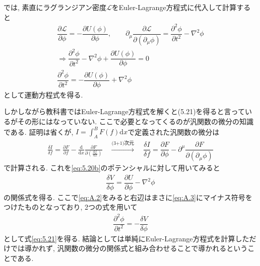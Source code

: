 \documentclass[dvipdfmx,11pt,a4paper,oneside,openany]{jsbook}
\begin{document}
では, 素直にラグランジアン密度$\mathcal{L}$をEuler-Lagrange方程式に代入して計算すると
\begin{align}
    \dfrac{\partial \mathcal{L}}{\partial \phi}=-\dfrac{\partial U(\phi)}{\partial\phi},\qquad \partial_\mu\dfrac{\partial\mathcal{L}}{\partial(\partial_\mu\phi)}=\dfrac{\partial^2 \phi}{\partial t^2}-\nabla^2\phi\nonumber \\
    \Rightarrow \dfrac{\partial^2 \phi}{\partial t^2}-\nabla^2\phi+\dfrac{\partial U(\phi)}{\partial \phi}=0\nonumber                                                                                                          \\
    \dfrac{\partial^2 \phi}{\partial t^2}=-\dfrac{\partial U(\phi)}{\partial \phi}+\nabla^2\phi\tag{A.2}\label{eq:A.2}
\end{align}
として運動方程式を得る.

しかしながら教科書ではEuler-Lagrange方程式を解くと(5.21)を得ると言っているがその形にはなっていない. ここで必要となってくるのが汎関数の微分の知識である. 証明は省くが, $I=\int_{A}^{B} F(f) \mathrm{d} x$で定義された汎関数の微分は
\begin{align*}
    \frac{\delta I}{\delta f}=\frac{\partial F}{\partial f}-\frac{\mathrm{d}}{\mathrm{d} x} \frac{\partial F}{\partial\left(\frac{\mathrm{d} f}{\mathrm{~d} x}\right)}\quad \xrightarrow[]{\text{(3+1)次元}} \quad \dfrac{\delta I}{\delta f}=\dfrac{\partial F}{\partial \phi}-\partial^{\mu}\dfrac{\partial F}{\partial\left(\partial_\mu \phi\right)}
\end{align*}
で計算される. これを\eqref{eq:5.20b}のポテンシャルに対して用いてみると
\begin{align}
    \dfrac{\delta V}{\delta \phi}=\dfrac{\partial U}{\partial \phi}-\nabla^2\phi\tag{A.3}\label{eq:A.3}
\end{align}
の関係式を得る. ここで\eqref{eq:A.2}をみると右辺はまさに\eqref{eq:A.3}にマイナス符号をつけたものとなっており, 2つの式を用いて
\begin{align}
    \dfrac{\partial^2 \phi}{\partial t^2}=-\dfrac{\delta V}{\delta \phi
    }\label{eq:5.21}
\end{align}
として式\eqref{eq:5.21}を得る. 結論としては単純にEuler-Lagrange方程式を計算しただけでは導かれず, 汎関数の微分の関係式と組み合わせることで導かれるということである.
\end{document}
